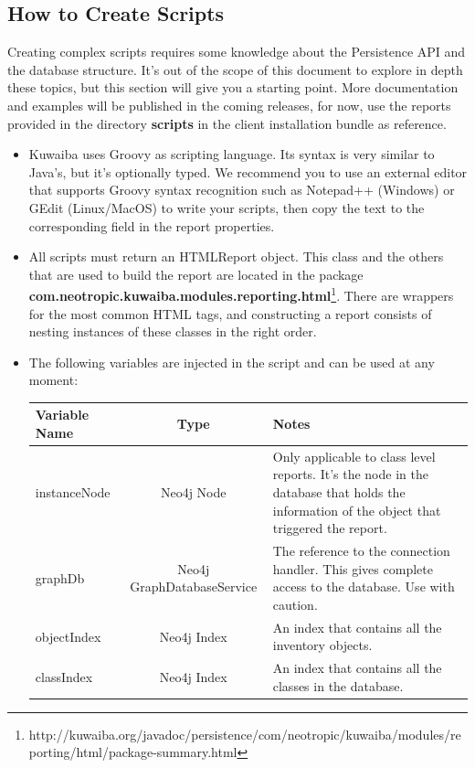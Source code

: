 \documentclass[a4paper]{article}
\begin{document}
		\subsection{How to Create Scripts}
		Creating complex scripts requires some knowledge about the Persistence API and the database structure. It's out of the scope of this document to explore in depth these topics, but this section will give you a starting point. More documentation and examples will be published in the coming releases, for now, use the reports provided in the directory \textbf{scripts} in the client installation bundle as reference.
		\begin{itemize}
			\item Kuwaiba uses Groovy as scripting language. Its syntax is very similar to Java's, but it's optionally typed. We recommend you to use an external editor that supports Groovy syntax recognition such as Notepad++ (Windows) or GEdit (Linux/MacOS) to write your scripts, then copy the text to the corresponding field in the report properties.
			\item All scripts must return an HTMLReport object. This class and the others that are used to build the report are located in the package \textbf{com.neotropic.kuwaiba.modules.reporting.html}\footnote{http://kuwaiba.org/javadoc/persistence/com/neotropic/kuwaiba/modules/reporting/html/package-summary.html}. There are wrappers for the most common HTML tags, and constructing a report consists of nesting instances of these classes in the right order.
			\item The following variables are injected in the script and can be used at any moment:
			\newpage
			\begin{table}[h!]
				\centering
				\begin{tabular}{lcp{7cm}}
					\toprule
					\textbf{Variable Name} & \textbf{Type} & \textbf{Notes} \\
					\midrule
					instanceNode & Neo4j Node & Only applicable to class level reports. It's the node in the database that holds the information of the object that triggered the report.\\
					\midrule
					graphDb & Neo4j GraphDatabaseService & The reference to the connection handler. This gives complete access to the database. Use with caution. \\
					\midrule
					objectIndex & Neo4j Index & An index that contains all the inventory objects. \\
					\midrule
					classIndex & Neo4j Index & An index that contains all the classes in the database. \\

\end{tabular}
\end{table}
\end{itemize}
\end{document}
